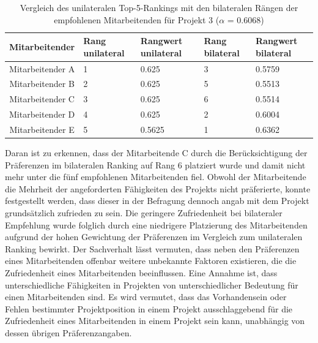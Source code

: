\begin{table}[htbp]
    \begin{center}
    \begin{tabular}{c|p{0.7in}|p{0.7in}|p{0.7in}|p{0.7in}}
    {\textbf{Mitarbeitender}} & {\textbf{Rang unilateral}} & {\textbf{Rangwert unilateral}} & {\textbf{Rang bilateral}} & {\textbf{Rangwert bilateral}} \\
    \hline
	Mitarbeitender A & \hfil1 & \hfil0.625 & \hfil3 & \hfil0.5759 \\
    \hline
    Mitarbeitender B & \hfil2 & \hfil0.625 & \hfil5 & \hfil0.5513 \\
    \hline
	Mitarbeitender C & \hfil3 & \hfil0.625 & \hfil6 & \hfil0.5514 \\
    \hline
	Mitarbeitender D & \hfil4 & \hfil0.625 & \hfil2 & \hfil0.6004 \\
    \hline
	Mitarbeitender E & \hfil5 & \hfil0.5625 & \hfil1 & \hfil0.6362 \\
    \end{tabular}
    \end{center}
    \caption[Vergleich des unilateralen Top-5-Rankings mit den bilateralen Rängen der empfohlenen Mitarbeitenden für Projekt 3 ($\alpha$ = 0.6068)]{Vergleich des unilateralen Top-5-Rankings mit den bilateralen Rängen der empfohlenen Mitarbeitenden für Projekt 3 ($\alpha$ = 0.6068)}
	\label{tab:diskussion:tab1}
\end{table}

Daran ist zu erkennen, dass der Mitarbeitende C durch die Berücksichtigung der Präferenzen im bilateralen Ranking auf Rang 6 platziert wurde und damit nicht mehr unter die fünf empfohlenen Mitarbeitenden fiel.
Obwohl der Mitarbeitende die Mehrheit der angeforderten Fähigkeiten des Projekts nicht präferierte, konnte festgestellt werden, dass dieser in der Befragung dennoch angab mit dem Projekt grundsätzlich zufrieden zu sein.
Die geringere Zufriedenheit bei bilateraler Empfehlung wurde folglich durch eine niedrigere Platzierung des Mitarbeitenden aufgrund der hohen Gewichtung der Präferenzen im Vergleich zum unilateralen Ranking bewirkt.
Der Sachverhalt lässt vermuten, dass neben den Präferenzen eines Mitarbeitenden offenbar weitere unbekannte Faktoren existieren, die die Zufriedenheit eines Mitarbeitenden beeinflussen.
Eine Annahme ist, dass unterschiedliche Fähigkeiten in Projekten von unterschiedlicher Bedeutung für einen Mitarbeitenden sind.
Es wird vermutet, dass das Vorhandensein oder Fehlen bestimmter Projektposition in einem Projekt ausschlaggebend für die Zufriedenheit eines Mitarbeitenden in einem Projekt sein kann, unabhängig von dessen übrigen Präferenzangaben.

